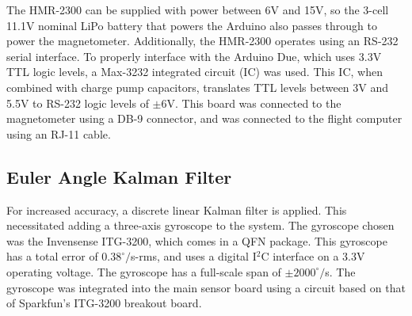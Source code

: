 The HMR-2300 can be supplied with power between 6V and 15V, so the 3-cell 11.1V nominal LiPo battery that powers the Arduino also passes through to power the magnetometer. Additionally, the HMR-2300 operates using an RS-232 serial interface. To properly interface with the Arduino Due, which uses 3.3V TTL logic levels, a Max-3232 integrated circuit (IC) was used. This IC, when combined with charge pump capacitors, translates TTL levels between 3V and 5.5V to RS-232 logic levels of $\pm6$V.
 This board was connected to the magnetometer using a DB-9 connector, and was connected to the flight computer using an RJ-11 cable.
\subsection*{Euler Angle Kalman Filter}
For increased accuracy, a discrete linear Kalman filter is applied. This necessitated adding a three-axis gyroscope to the system. The gyroscope chosen was the Invensense ITG-3200, which comes in a QFN package. This gyroscope has a total error of $0.38^\circ/$s-rms\cite{itg3200DataSheet}, and uses a digital I$^2$C interface on a 3.3V operating voltage. The gyroscope has a full-scale span of $\pm2000^\circ/$s. The gyroscope was integrated into the main sensor board using a circuit based on that of Sparkfun's ITG-3200 breakout board\cite{itg3200BOBSchematic}.


